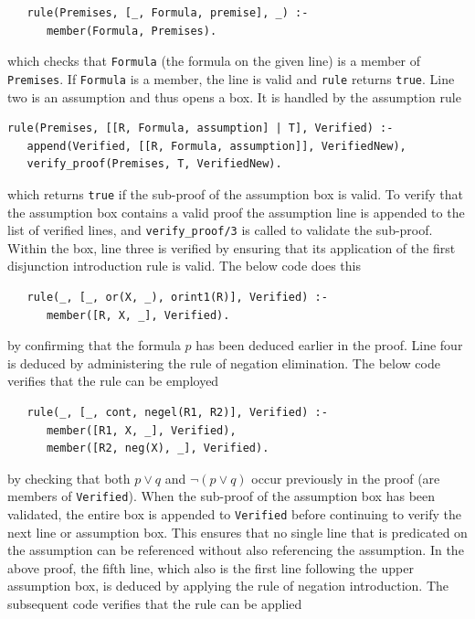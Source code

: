 \documentclass[a4paper, 11pt]{article}
\begin{document}
\begin{verbatim}
   rule(Premises, [_, Formula, premise], _) :-
      member(Formula, Premises).
\end{verbatim}
                    
   which checks that \texttt{Formula} (the formula
   on the given line) is a member of
   \texttt{Premises}. If \texttt{Formula} is a
   member, the line is valid and \texttt{rule} returns
   \texttt{true}. Line two is an assumption and thus 
   opens a box. It is handled by the assumption rule

\begin{verbatim}
rule(Premises, [[R, Formula, assumption] | T], Verified) :-
   append(Verified, [[R, Formula, assumption]], VerifiedNew),
   verify_proof(Premises, T, VerifiedNew).
\end{verbatim}

   which returns \texttt{true} if the sub-proof of the
   assumption box is valid. To verify that the
   assumption box contains a valid proof the
   assumption line is appended to the list of
   verified lines, and \texttt{verify\_proof/3} is
   called to validate the sub-proof. Within the box,
   line three is verified by ensuring that its
   application of the first disjunction introduction
   rule is valid. The below code does this

\begin{verbatim}
   rule(_, [_, or(X, _), orint1(R)], Verified) :-
      member([R, X, _], Verified).
\end{verbatim}

   by confirming that the formula $p$ has been
   deduced earlier in the proof. Line four is deduced
   by administering the rule of negation elimination.
   The below code verifies that the rule can be
   employed

\begin{verbatim}
   rule(_, [_, cont, negel(R1, R2)], Verified) :-
      member([R1, X, _], Verified),
      member([R2, neg(X), _], Verified).
\end{verbatim}

   by checking that both $p \vee q$ and 
   $\neg(p \vee q)$ occur previously in the proof
   (are members of \texttt{Verified}). When the
   sub-proof of the assumption box has been
   validated, the entire box is appended to
   \texttt{Verified} before continuing to verify the
   next line or assumption box. This ensures that no
   single line that is predicated on the assumption
   can be referenced without also referencing the
   assumption. In the above proof, the fifth line, 
   which also is the first line following the
   upper assumption box, is deduced by applying the
   rule of negation introduction. The subsequent code
   verifies that the rule can be applied
\end{document}
